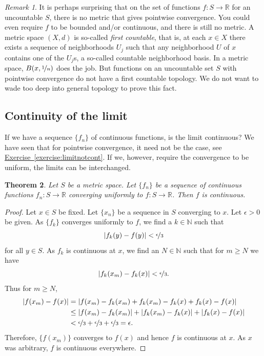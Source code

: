 \documentclass[12pt,openany]{book}
\newcommand{\abs}[1]{\left\lvert {#1} \right\rvert}
\newcommand{\R}{{\mathbb{R}}}
\newcommand{\N}{{\mathbb{N}}}
\newcommand{\myindex}[1]{#1\index{#1}}
\theoremstyle{plain}
\newtheorem{thm}{Theorem}[section]
\theoremstyle{remark}
\newtheorem{remark}[thm]{Remark}
\theoremstyle{definition}
\theoremstyle{exercise}
\theoremstyle{example}
\newcommand{\exerciseref}[1]{\hyperref[#1]{Exercise~\ref*{#1}}}
\begin{document}
\begin{remark}
It is perhaps surprising that on the set of functions $f \colon S \to
\R$ for an uncountable $S$, there is no metric that gives pointwise convergence.
You could even require $f$ to be bounded and/or continuous, and there is
still no metric.
A metric space $(X,d)$ is so-called \emph{\myindex{first countable}}, that
is, at each $x \in X$ there exists a sequence of neighborhoods $U_j$ such
that any neighborhood $U$ of $x$ contains one of the $U_j$s, a so-called
countable neighborhood basis.  In a metric space, $B(x,\nicefrac{1}{n})$
does the job.  But functions on an uncountable set $S$ with pointwise
convergence do not have a first countable topology.  We do not want to
wade too deep into general topology to prove this fact.
\end{remark}

\subsection{Continuity of the limit}

If we have a sequence $\{ f_n \}$ of continuous functions,
is the limit continuous?  We have seen that for pointwise
convergence, it need not be the case, see \exerciseref{exercise:limitnotcont}.
If we, however, require the convergence to be uniform, the limits can
be interchanged.

\begin{thm} \label{thm:uniformlimitcont}
Let $S$ be a metric space.
Let $\{ f_n \}$ be 
a sequence of continuous functions $f_n \colon S \to \R$ converging
uniformly to  $f \colon S \to \R$.  Then $f$ is continuous.
\end{thm}

\begin{proof}
Let $x \in S$ be fixed.  Let $\{ x_n \}$ be a sequence in $S$
converging to $x$.
Let $\epsilon > 0$ be given.
As $\{ f_k \}$ converges uniformly to $f$, we find a $k \in \N$ such that
\begin{equation*}
\abs{f_k(y)-f(y)} < \nicefrac{\epsilon}{3}
\end{equation*}
for all $y \in S$.  As $f_k$ is continuous at $x$,
we find an $N \in \N$ such that for $m \geq N$
we have 
\begin{equation*}
\abs{f_k(x_m)-f_k(x)} < \nicefrac{\epsilon}{3} .
\end{equation*}
Thus for
$m \geq N$,
\begin{equation*}
\begin{split}
\abs{f(x_m)-f(x)}
& =
\abs{f(x_m)-f_k(x_m)+f_k(x_m)-f_k(x)+f_k(x)-f(x)}
\\
& \leq
\abs{f(x_m)-f_k(x_m)}+
\abs{f_k(x_m)-f_k(x)}+
\abs{f_k(x)-f(x)}
\\
& <
\nicefrac{\epsilon}{3} +
\nicefrac{\epsilon}{3} +
\nicefrac{\epsilon}{3} = \epsilon .
\end{split}
\end{equation*}
Therefore, $\{ f(x_m) \}$ converges to $f(x)$ and hence $f$ is continuous at
$x$.  As $x$ was arbitrary, $f$ is continuous everywhere.
\end{proof}
\end{document}
